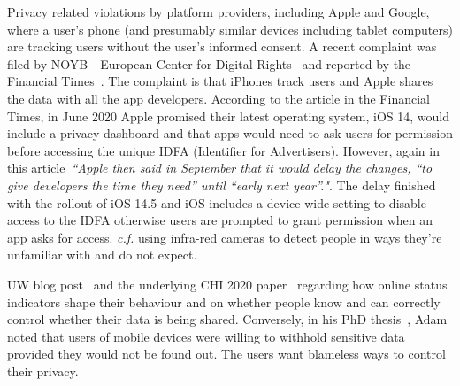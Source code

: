 Privacy related violations by platform providers, including Apple and Google, where a user's phone (and presumably similar devices including tablet computers) are tracking users without the user's informed consent. A recent complaint was filed by NOYB - European Center for Digital Rights~ and reported by the Financial Times~. The complaint is that iPhones track users and Apple shares the data with all the app developers. According to the article in the Financial Times, in June 2020 Apple promised their latest operating system, iOS 14, would include a privacy dashboard and that apps would need to ask users for permission before accessing the unique IDFA (Identifier for Advertisers). However, again in this article~\emph{``Apple then said in September that it would delay the changes, “to give developers the time they need” until “early next year”."}. The delay finished with the rollout of iOS 14.5 and iOS includes a device-wide setting to disable access to the IDFA otherwise users are prompted to grant permission when an app asks for access. %
\emph{c.f.} using infra-red cameras to detect people in ways they're unfamiliar with and do not expect. 

UW blog post~ and the underlying CHI 2020 paper~ regarding how online status indicators shape their behaviour and on whether people know and can correctly control whether their data is being shared. Conversely, in his PhD thesis~, Adam noted that users of mobile devices were willing to withhold sensitive data provided they would not be found out. The users want blameless ways to control their privacy.

